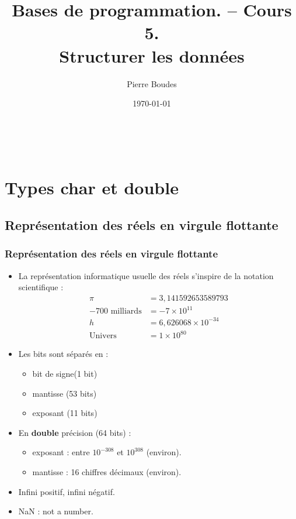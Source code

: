 \documentclass[xcolor=pdftex,svgnames,table]{beamer}
\title{Bases de programmation. -- Cours 5.\\ Structurer les données}
\author{Pierre Boudes}
\date{\today}
\begin{document}
\begin{frame}
        \titlepage
        \vfill
        \begin{center}
                \\[2.5ex]
                {\tiny\CcNote{\CcLongnameByNcSa}}
                \vspace*{-2.5ex}
        \end{center}
\end{frame}


\section[Plan]{}
\frame[label=plan]{\tableofcontents}
\section[Types char et double]{Types char et double}
\subsection{Représentation des réels en virgule flottante}
\begin{frame}
    \frametitle{Représentation des réels en virgule flottante}
    \begin{itemize}
    \item La représentation informatique usuelle des réels s'inspire de la
      notation scientifique :
      \begin{align*}
        \pi &= 3,141592653589793\tag{pi}\\
        -700 \text{ milliards} &= -7 \times 10^{11}\tag{Paulson}\\
        h &= 6,626068 \times 10^{-34} \tag{Planck}\\
        \text{Univers} &= 1 \times 10^{80}  \tag{Atomes}
      \end{align*}\pause
\vspace{-.8cm}
\item Les bits sont séparés en :
  \begin{itemize}
  \item bit de signe\hfill (1 bit)
  \item mantisse \hfill (53 bits)
  \item exposant \hfill (11 bits)
  \end{itemize}\pause
\item En \textbf{double} précision (64 bits) :
  \begin{itemize}
\item exposant : entre $10^{-308}$ et $10^{308}$ (environ).
\item mantisse : 16 chiffres décimaux (environ).
  \end{itemize}\pause
\item Infini positif, infini négatif.
\item NaN : not a number.
    \end{itemize}
\end{frame}
\end{document}
